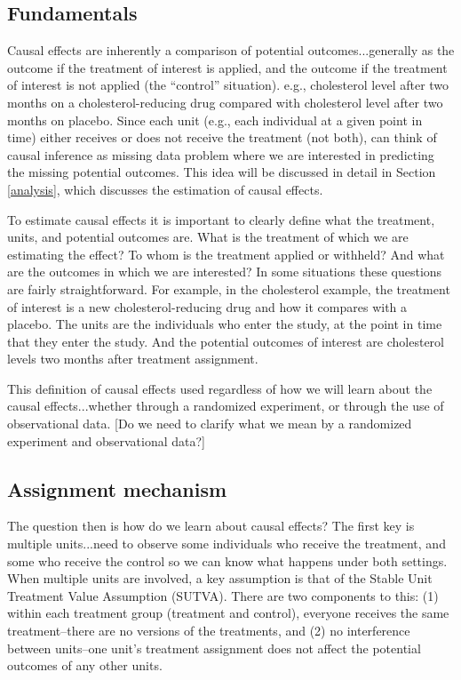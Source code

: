 \documentclass[11pt,titlepage]{article}
\begin{document}
\subsection{Fundamentals}
Causal effects are inherently a comparison of potential outcomes...generally as the outcome if the treatment of interest
is applied, and the outcome if the treatment of interest is not applied (the ``control'' situation).  e.g., cholesterol level
after two months on a cholesterol-reducing drug compared with cholesterol level after two months on placebo.   Since each unit (e.g., each individual
at a given point in time) either receives or does not receive the treatment (not both), can think of causal inference as missing data problem where 
we are interested in predicting the missing potential outcomes.  This idea will be discussed in detail in Section \ref{analysis}, which discusses the 
estimation of causal effects.

To estimate causal effects it is important to clearly define what the treatment, units, and potential outcomes are.  What is the treatment of which we are 
estimating the effect?  To whom is the treatment applied or withheld?  And what are the outcomes in which we are interested?  In some situations these
questions are fairly straightforward.  For example, in the cholesterol example, the treatment of interest is a new cholesterol-reducing drug and how it compares
with a placebo.  The units are the individuals who enter the study, at the point in time that they enter the study.  And the potential outcomes of interest
are cholesterol levels two months after treatment assignment.

This definition of causal effects used regardless of how we will learn about the causal effects...whether through a randomized experiment, or through the use of 
observational data.  [Do we need to clarify what we mean by a randomized experiment and observational data?]

\subsection{Assignment mechanism}
The question then is how do we learn about causal effects?  The first key is multiple units...need to observe some individuals who receive the treatment,
and some who receive the control so we can know what happens under both settings.  When multiple units are involved, a key assumption
is that of the Stable Unit Treatment Value Assumption (SUTVA).  There are two components to this: (1) within each treatment group (treatment and control), 
everyone receives the same treatment--there are no versions of the treatments, and (2) no interference between units--one unit's treatment assignment does
not affect the potential outcomes of any other units. 
\end{document}
